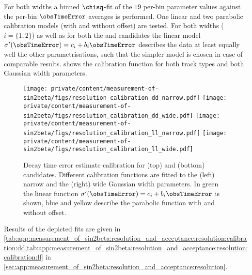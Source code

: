 For both widths a binned $\chisq$-fit of the $\num{19}$ per-bin parameter values
against the per-bin $\obsTimeError$ averages is performed. One linear and two
parabolic calibration models (with and without offset) are tested. For both
widths ($i = \{1,2\}$) as well as for both the \catDD and \catLL candidates the linear model
$\sigma^\prime(\obsTimeError) = c_i + b_i \obsTimeError$ describes the data at
least equally well \wrt the other parametrisations, such that the simpler model
is chosen in case of comparable results.
shows the calibration function for both track types and both Gaussian width
parameters.
%
\begin{figure}[h]
\texttt{[image: private/content/measurement-of-sin2beta/figs/resolution\_calibration\_dd\_narrow.pdf]}
\texttt{[image: private/content/measurement-of-sin2beta/figs/resolution\_calibration\_dd\_wide.pdf]}
\texttt{[image: private/content/measurement-of-sin2beta/figs/resolution\_calibration\_ll\_narrow.pdf]}
\texttt{[image: private/content/measurement-of-sin2beta/figs/resolution\_calibration\_ll\_wide.pdf]}
\caption{Decay time error estimate calibration for (top) \catDD and (bottom)
\catLL candidates. Different calibration functions are fitted to the (left)
narrow and the (right) wide Gaussian width parameters. In green the linear
function $\sigma^\prime(\obsTimeError) = c_i + b_i \obsTimeError$ is shown, blue
and yellow describe the parabolic function with and without offset.}
\label{fig:measurement_of_sin2beta:resolution_and_acceptance:resolution:calibration}
\end{figure}
%
Results of the depicted fits are given in 
\cref{tab:app:measurement_of_sin2beta:resolution_and_acceptance:resolution:calibration:dd,tab:app:measurement_of_sin2beta:resolution_and_acceptance:resolution:calibration:ll}
in \cref{sec:app:measurement_of_sin2beta:resolution_and_acceptance:resolution}.

